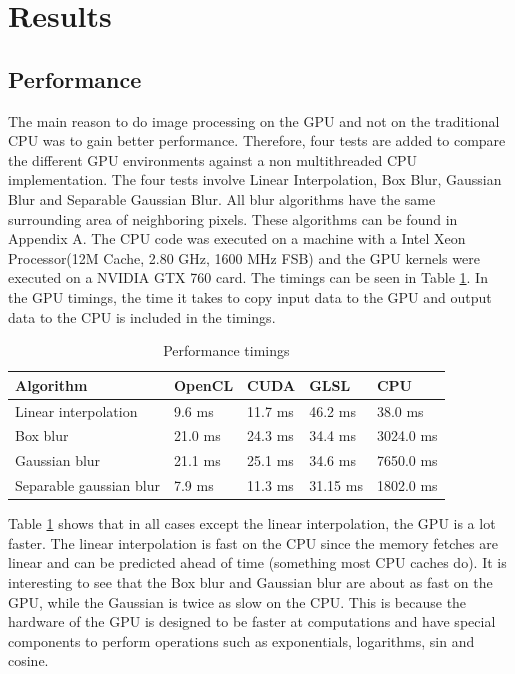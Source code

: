 \section{Results}
\subsection{Performance}

The main reason to do image processing on the GPU and not on the traditional CPU was to gain better performance. Therefore, four tests are added to compare the different GPU environments against a non multithreaded CPU implementation. The four tests involve Linear Interpolation, Box Blur, Gaussian Blur and Separable Gaussian Blur. All blur algorithms have the same surrounding area of neighboring pixels. These algorithms can be found in Appendix A. The CPU code was executed on a machine with a Intel Xeon Processor(12M Cache, 2.80 GHz, 1600 MHz FSB) and the GPU kernels were executed on a NVIDIA GTX 760 card. The timings can be seen in Table \ref{tab}. In the GPU timings, the time it takes to copy input data to the GPU and output data to the CPU is included in the timings.

\begin {table}[H]
\caption {Performance timings} \label{tab} 
\begin{center}
    \begin{tabular}{| l | l | l | l | l |}
    \hline
    \textbf{Algorithm} & \textbf{OpenCL} & \textbf{CUDA} & \textbf{GLSL} & \textbf{CPU} \\ \hline
    Linear interpolation & 9.6 ms & 11.7 ms & 46.2 ms & 38.0 ms \\ \hline
    Box blur & 21.0 ms & 24.3 ms & 34.4 ms & 3024.0 ms \\ \hline
    Gaussian blur & 21.1 ms & 25.1 ms & 34.6 ms & 7650.0 ms \\ \hline
    Separable gaussian blur & 7.9 ms & 11.3 ms & 31.15 ms & 1802.0 ms \\
    \hline
    \end{tabular}
\end{center}
\end{table}

Table \ref{tab} shows that in all cases except the linear interpolation, the GPU is a lot faster. The linear interpolation is fast on the CPU since the memory fetches are linear and can be predicted ahead of time (something most CPU caches do). It is interesting to see that the Box blur and Gaussian blur are about as fast on the GPU, while the Gaussian is twice as slow on the CPU. This is because the hardware of the GPU is designed to be faster at computations and have special components to perform operations such as exponentials, logarithms, sin and cosine.

